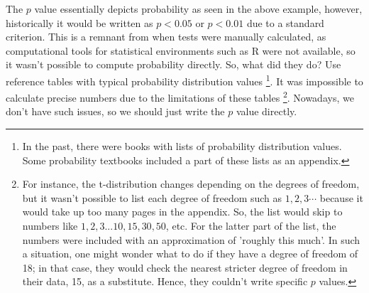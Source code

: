 \documentclass{ltjsbook}
\begin{document}
The $p$ value essentially depicts probability as seen in the above example, however, historically it would be written as $p<0.05$ or $p<0.01$ due to a standard criterion. This is a remnant from when tests were manually calculated, as computational tools for statistical environments such as R were not available, so it wasn't possible to compute probability directly. So, what did they do? Use reference tables with typical probability distribution values \footnote{In the past, there were books with lists of probability distribution values. Some probability textbooks included a part of these lists as an appendix.}. It was impossible to calculate precise numbers due to the limitations of these tables \footnote{For instance, the t-distribution changes depending on the degrees of freedom, but it wasn't possible to list each degree of freedom such as $1, 2, 3 \cdots$ because it would take up too many pages in the appendix. So, the list would skip to numbers like $1, 2, 3... 10, 15, 30, 50$, etc. For the latter part of the list, the numbers were included with an approximation of 'roughly this much'. In such a situation, one might wonder what to do if they have a degree of freedom of 18; in that case, they would check the nearest stricter degree of freedom in their data, 15, as a substitute. Hence, they couldn't write specific $p$ values.}. Nowadays, we don't have such issues, so we should just write the $p$ value directly.

\end{document}
